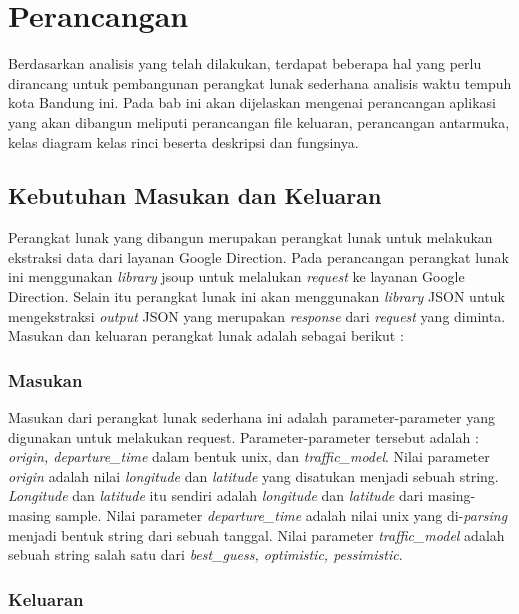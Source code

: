 \chapter{Perancangan}
\label{chap:perancangan}

Berdasarkan analisis yang telah dilakukan, terdapat beberapa hal yang perlu dirancang untuk pembangunan perangkat lunak sederhana analisis waktu tempuh kota Bandung ini. Pada bab ini akan dijelaskan mengenai perancangan aplikasi yang akan dibangun meliputi perancangan file keluaran, perancangan antarmuka, kelas diagram kelas rinci beserta deskripsi dan fungsinya.

\section{Kebutuhan Masukan dan Keluaran}
\label{sec:kebutuhaninputoutput}

Perangkat lunak yang dibangun merupakan perangkat lunak untuk melakukan ekstraksi data dari layanan Google Direction. Pada perancangan perangkat lunak ini menggunakan \textit{library} jsoup untuk melalukan \textit{request} ke layanan Google Direction. Selain itu perangkat lunak ini akan menggunakan \textit{library} JSON untuk mengekstraksi \textit{output} JSON yang merupakan \textit{response} dari \textit{request} yang diminta. Masukan dan keluaran perangkat lunak adalah sebagai berikut :

\subsection{Masukan}
\label{subsec:input}

Masukan dari perangkat lunak sederhana ini adalah parameter-parameter yang digunakan untuk melakukan request. Parameter-parameter tersebut adalah : \textit{origin, departure\_time} dalam bentuk unix, dan \textit{traffic\_model}. Nilai parameter \textit{origin} adalah nilai \textit{longitude} dan \textit{latitude} yang disatukan menjadi sebuah string. \textit{Longitude} dan \textit{latitude} itu sendiri adalah \textit{longitude} dan \textit{latitude} dari masing-masing sample. Nilai parameter \textit{departure\_time} adalah nilai unix yang di-\textit{parsing} menjadi bentuk string dari sebuah tanggal. Nilai parameter \textit{traffic\_model} adalah sebuah string salah satu dari \textit{best\_guess, optimistic, pessimistic}.

\subsection{Keluaran}
\label{subsec:output}

